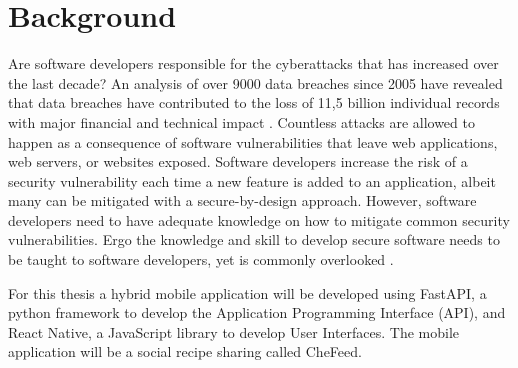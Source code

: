 \section{Background}
Are software developers responsible for the cyberattacks that has increased over the last decade? An analysis of over 9000 data breaches since 2005 have revealed that data breaches have contributed to the loss of 11,5 billion individual records with major financial and technical impact \cite{Hammouchi_2019}. Countless attacks are allowed to happen as a consequence of software vulnerabilities that leave web applications, web servers, or websites exposed. Software developers increase the risk of a security vulnerability each time a new feature is added to an application, albeit many can be mitigated with a secure-by-design approach. However, software developers need to have adequate knowledge on how to mitigate common security vulnerabilities. Ergo the knowledge and skill to develop secure software needs to be taught to software developers, yet is commonly overlooked \cite{Tabassum_2018}.




For this thesis a hybrid mobile application will be developed using FastAPI, a python framework to develop the Application Programming Interface (API), and React Native, a JavaScript library to develop User Interfaces. The mobile application will be a social recipe sharing called CheFeed.


